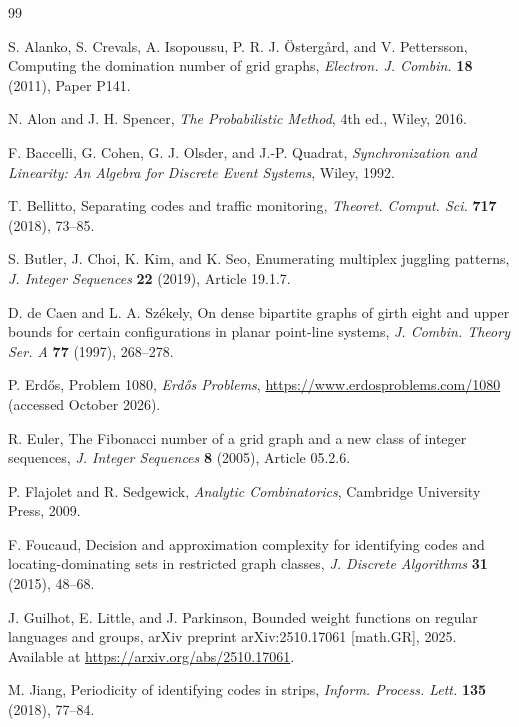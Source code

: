 \documentclass[12pt]{article}
\theoremstyle{plain}
\theoremstyle{definition}
\theoremstyle{remark}
\begin{document}
\begin{thebibliography}{99}
\small\setlength{\baselineskip}{11pt}\setlength{\itemsep}{0pt}\setlength{\parsep}{0pt}

S. Alanko, S. Crevals, A. Isopoussu, P. R. J. \"Osterg\r{a}rd, and V. Pettersson,
Computing the domination number of grid graphs, \emph{Electron. J. Combin.}
\textbf{18} (2011), Paper P141.

N. Alon and J. H. Spencer, \emph{The Probabilistic Method}, 4th ed., Wiley, 2016.

F. Baccelli, G. Cohen, G. J. Olsder, and J.-P. Quadrat, \emph{Synchronization and
Linearity: An Algebra for Discrete Event Systems}, Wiley, 1992.

T. Bellitto, Separating codes and traffic monitoring, \emph{Theoret. Comput. Sci.}
\textbf{717} (2018), 73--85.

S. Butler, J. Choi, K. Kim, and K. Seo, Enumerating multiplex juggling patterns,
\emph{J. Integer Sequences} \textbf{22} (2019), Article 19.1.7.

D. de Caen and L. A. Sz\'ekely, On dense bipartite graphs of girth eight and upper
bounds for certain configurations in planar point-line systems, \emph{J. Combin.
Theory Ser. A} \textbf{77} (1997), 268--278.

P. Erd\H{o}s, Problem 1080, \emph{Erd\H{o}s Problems},
\url{https://www.erdosproblems.com/1080} (accessed October 2026).

R. Euler, The Fibonacci number of a grid graph and a new class of integer sequences,
\emph{J. Integer Sequences} \textbf{8} (2005), Article 05.2.6.

P. Flajolet and R. Sedgewick, \emph{Analytic Combinatorics}, Cambridge University
Press, 2009.

F. Foucaud, Decision and approximation complexity for identifying codes and
locating-dominating sets in restricted graph classes, \emph{J. Discrete Algorithms}
\textbf{31} (2015), 48--68.

J. Guilhot, E. Little, and J. Parkinson, Bounded weight functions on regular languages
and groups, arXiv preprint arXiv:2510.17061 [math.GR], 2025. Available at
\url{https://arxiv.org/abs/2510.17061}.

M. Jiang, Periodicity of identifying codes in strips, \emph{Inform. Process. Lett.}
\textbf{135} (2018), 77--84.


\end{thebibliography}
\end{document}
